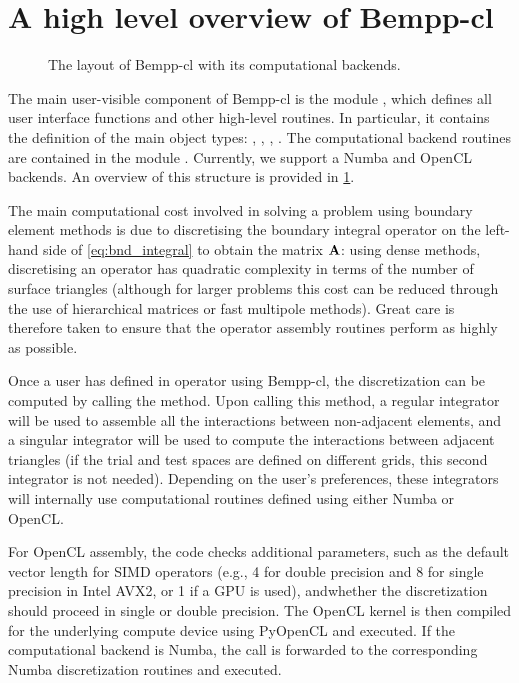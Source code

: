 \section{A high level overview of Bempp-cl}

\begin{figure}
  \centering
  
  \caption{The layout of Bempp-cl with its computational backends.}
  \label{fig:overview}
\end{figure}

The main user-visible component of Bempp-cl is the module , which defines all user interface functions and other high-level routines. In particular, it contains the definition of the main object types: , , , . The computational backend routines are contained in the module . Currently, we support a Numba and OpenCL backends. An overview of this structure is provided in \cref{fig:overview}.

The main computational cost involved in solving a problem using boundary element methods is due to discretising the boundary integral operator on the left-hand side of \cref{eq:bnd_integral} to obtain the matrix $\mathbf{A}$: using dense methods, discretising an operator has quadratic complexity in terms of the number of surface triangles (although for larger problems this cost can be reduced through the use of hierarchical matrices or fast multipole methods). Great care is therefore taken to ensure that the operator assembly routines perform as highly as possible.

Once a user has defined in operator using Bempp-cl, the discretization can be computed by calling the  method. Upon calling this method, a regular integrator will be used to assemble all the interactions between non-adjacent elements, and a singular integrator will be used to compute the interactions between adjacent triangles (if the trial and test spaces are defined on different grids, this second integrator is not needed). Depending on the user's preferences, these integrators will internally use computational routines defined using either Numba or OpenCL.

For OpenCL assembly, the code checks additional parameters, such as the default vector length for SIMD operators (e.g., 4 for double precision and 8 for single precision in Intel AVX2, or 1 if a GPU is used), andwhether the discretization should proceed in single or double precision. The OpenCL kernel is then compiled for the underlying compute device using PyOpenCL and executed. If the computational backend is Numba, the call is forwarded to the corresponding Numba discretization routines and executed.

